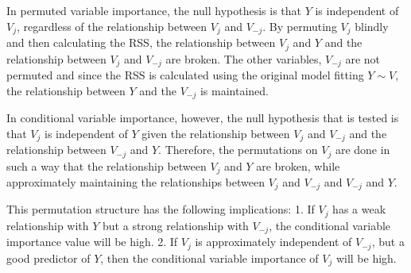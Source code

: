 \documentclass[12pt,twoside]{reedthesis}
\begin{document}
  In permuted variable importance, the null hypothesis is that \(Y\) is
  independent of \(V_j\), regardless of the relationship between \(V_j\)
  and \(V_{-j}\). By permuting \(V_j\) blindly and then calculating the
  RSS, the relationship between \(V_j\) and \(Y\) and the relationship
  between \(V_j\) and \(V_{-j}\) are broken. The other variables,
  \(V_{-j}\) are not permuted and since the RSS is calculated using the
  original model fitting \(Y \sim V\), the relationship between \(Y\) and
  the \(V_{-j}\) is maintained.
  
  \usetikzlibrary{positioning}
  
  \begin{center}
  \end{center}
  
  In conditional variable importance, however, the null hypothesis that is
  tested is that \(V_j\) is independent of \(Y\) given the relationship
  between \(V_j\) and \(V_{-j}\) and the relationship between \(V_{-j}\)
  and \(Y\). Therefore, the permutations on \(V_j\) are done in such a way
  that the relationship between \(V_j\) and \(Y\) are broken, while
  approximately maintaining the relationships between \(V_j\) and
  \(V_{-j}\) and \(V_{-j}\) and \(Y\).
  
  \usetikzlibrary{positioning}
  
  \begin{center}
  \end{center}
  
  This permutation structure has the following implications: 1. If \(V_j\)
  has a weak relationship with \(Y\) but a strong relationship with
  \(V_{-j}\), the conditional variable importance value will be high. 2.
  If \(V_j\) is approximately independent of \(V_{-j}\), but a good
  predictor of \(Y\), then the conditional variable importance of \(V_j\)
  will be high.
  
\end{document}
